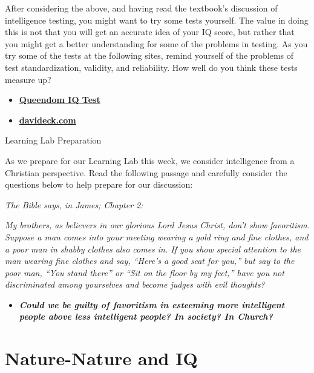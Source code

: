 \documentclass[
]{book}
\providecommand{\tightlist}{%
  \setlength{\itemsep}{0pt}\setlength{\parskip}{0pt}}
\begin{document}
\begin{reflect}
After considering the above, and having read the textbook's discussion of intelligence testing, you might want to try some tests yourself. The value in doing this is not that you will get an accurate idea of your IQ score, but rather that you might get a better understanding for some of the problems in testing. As you try some of the tests at the following sites, remind yourself of the problems of test standardization, validity, and reliability. How well do you think these tests measure up?

\begin{itemize}
\tightlist
\item
  \href{https://www.queendom.com/tests/index.htm}{\textbf{Queendom IQ Test}}\\
\item
  \href{http://www.davideck.com/}{\textbf{davideck.com}}
\end{itemize}

{Learning Lab Preparation}

As we prepare for our Learning Lab this week, we consider intelligence from a Christian perspective. Read the following passage and carefully consider the questions below to help prepare for our discussion:

\emph{The Bible says, in James; Chapter 2:}

\emph{My brothers, as believers in our glorious Lord Jesus Christ, don't show favoritism. Suppose a man comes into your meeting wearing a gold ring and fine clothes, and a poor man in shabby clothes also comes in. If you show special attention to the man wearing fine clothes and say, ``Here's a good seat for you,'' but say to the poor man, ``You stand there'' or ``Sit on the floor by my feet,'' have you not discriminated among yourselves and become judges with evil thoughts?}

\begin{itemize}
\tightlist
\item
  \textbf{\emph{Could we be guilty of favoritism in esteeming more intelligent people above less intelligent people? In society? In Church?}}
\end{itemize}
\end{reflect}

\hypertarget{nature-nature-and-iq}{%
\section{Nature-Nature and IQ}\label{nature-nature-and-iq}}
\end{document}
